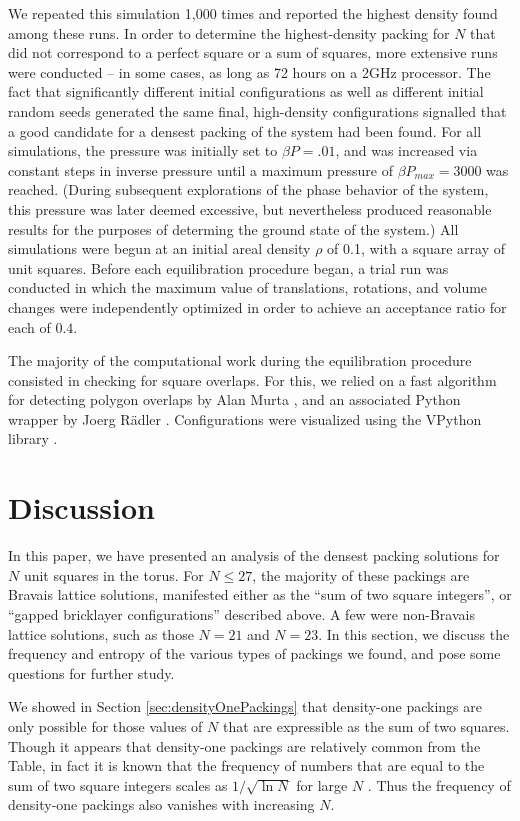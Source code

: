 \documentclass[aps]{revtex4}
\begin{document}
We repeated this simulation 1,000 times and reported the highest density found among these runs.  In order to determine the highest-density packing for $N$ that did not correspond to a perfect square or a sum of squares, more extensive runs were conducted -- in some cases, as long as 72 hours on a 2GHz processor.  The fact that significantly different initial configurations as well as different initial random seeds generated the same final, high-density configurations signalled that a good candidate for a densest packing of the system had been found.  For all simulations, the pressure was initially set to $\beta P=.01$, and was increased via constant steps in inverse pressure until a maximum pressure of $\beta P_{max}=3000$ was reached. (During subsequent explorations of the phase behavior of the system, this pressure was later deemed excessive, but nevertheless produced reasonable results for the purposes of determing the ground state of the system.) All simulations were begun at an initial areal density $\rho$ of 0.1, with a square array of unit squares. Before each equilibration procedure began, a trial run was conducted in which the maximum value of translations, rotations, and volume changes were independently optimized in order to achieve an acceptance ratio for each of $0.4$. 

The majority of the computational work during the equilibration procedure consisted in checking for square overlaps.  For this, we relied on a fast algorithm for detecting polygon overlaps by Alan Murta \cite{Murta}, and an associated Python wrapper by Joerg R\"adler \cite{Radler}. Configurations were visualized using the VPython library \cite{Scherer2000}.


\section{Discussion}
\label{sec:discussion}

In this paper, we have presented an analysis of the densest packing solutions for $N$ unit squares in the torus.  For $N \leq 27$, the majority of these packings are Bravais lattice solutions, manifested either as the ``sum of two square integers'', or ``gapped bricklayer configurations'' described above. A few were non-Bravais lattice solutions, such as those $N=21$ and $N=23$. In this section, we discuss the frequency and entropy of the various types of packings we found, and pose some questions for further study.

We showed in Section \ref{sec:densityOnePackings} that density-one packings are only possible for those values of $N$ that are expressible as the sum of two squares. 
Though it appears that density-one packings are relatively common from the Table, in fact it is known that the frequency of numbers that are equal to the sum of two square integers scales as $1/\sqrt{\ln N}$ for large $N$ \cite{Berndt1993,Landau1909}.
Thus the frequency of density-one packings also vanishes with increasing $N$.
\end{document}
